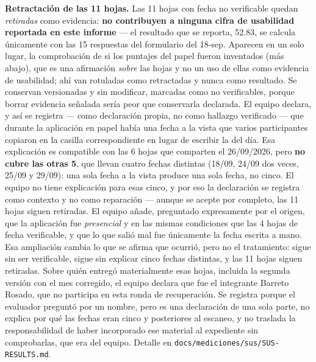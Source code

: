\textbf{Retractación de las 11 hojas.} Las 11 hojas con fecha no verificable quedan
\emph{retiradas} como evidencia: \textbf{no contribuyen a ninguna cifra de usabilidad reportada en este
informe} --- el resultado que se reporta, 52.83, se calcula únicamente con las 15 respuestas del
formulario del 18-sep. Aparecen en un solo lugar, la comprobación de si los puntajes del papel fueron
inventados (más abajo), que es una afirmación \emph{sobre} las hojas y no un uso de ellas como evidencia
de usabilidad; ahí van rotuladas como retractadas y nunca como resultado. Se conservan
versionadas y sin modificar, marcadas como no verificables, porque borrar evidencia señalada sería peor
que conservarla declarada. El equipo declara, y así se registra --- como declaración propia, no como
hallazgo verificado --- que durante la aplicación en papel había una fecha a la vista que varios
participantes copiaron en la casilla correspondiente en lugar de escribir la del día. Esa explicación es
compatible con las 6 hojas que comparten el 26/09/2026, pero \textbf{no cubre las otras 5}, que llevan
cuatro fechas distintas (18/09, 24/09 dos veces, 25/09 y 29/09): una sola fecha a la vista produce una
sola fecha, no cinco. El equipo no tiene explicación para esas cinco, y por eso la declaración se
registra como contexto y no como reparación --- aunque se acepte por completo, las 11 hojas siguen
retiradas. El equipo añade, preguntado expresamente por el origen, que la aplicación fue
\emph{presencial} y en las mismas condiciones que las 4 hojas de fecha verificable, y que lo que salió
mal fue únicamente la fecha escrita a mano. Esa ampliación cambia lo que se afirma que ocurrió, pero no
el tratamiento: sigue sin ser verificable, sigue sin explicar cinco fechas distintas, y las 11 hojas
siguen retiradas. Sobre quién entregó materialmente esas hojas, incluida la segunda versión con el mes
corregido, el equipo declara que fue el integrante Barreto Rosado, que no participa en esta ronda de
recuperación. Se registra porque el evaluador preguntó por un nombre, pero es una declaración de una
sola parte, no explica por qué las fechas eran cinco y posteriores al escaneo, y no traslada la
responsabilidad de haber incorporado ese material al expediente sin comprobarlas, que era del equipo.
Detalle en \texttt{docs/mediciones/sus/SUS-RESULTS.md}.


